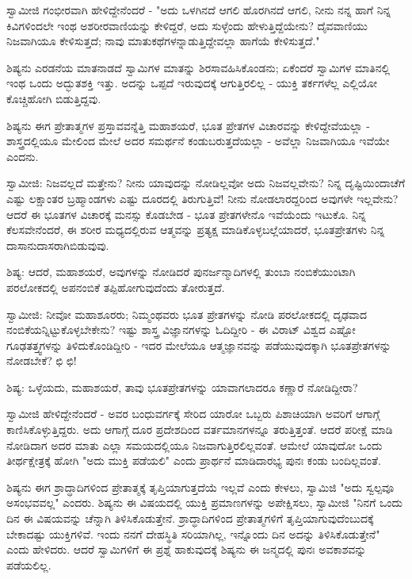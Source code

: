 ಸ್ವಾಮೀಜಿ ಗಂಭೀರವಾಗಿ ಹೇಳಿದ್ದೇನೆಂದರೆ - "ಅದು ಒಳಗಿನದೆ ಆಗಲಿ ಹೊರಗಿನದೆ ಆಗಲಿ, ನೀನು ನನ್ನ ಹಾಗೆ ನಿನ್ನ ಕಿವಿಗಳಿಂದಲೇ ಇಂಥ ಅಶರೀರವಾಣಿಯನ್ನು ಕೇಳಿದ್ದರೆ, ಅದು ಸುಳ್ಳೆಂದು ಹೇಳುತ್ತಿದ್ದೆಯೇನು? ದೈವವಾಣಿಯು ನಿಜವಾಗಿಯೂ ಕೇಳಿಸುತ್ತದೆ; ನಾವು ಮಾತುಕಥೆಗಳನ್ನಾಡುತ್ತಿದ್ದೇವಲ್ಲಾ ಹಾಗೆಯೆ ಕೇಳಿಸುತ್ತದೆ."

ಶಿಷ್ಯನು ಎರಡನೆಯ ಮಾತನಾಡದೆ ಸ್ವಾಮಿಗಳ ಮಾತನ್ನು ಶಿರಸಾವಹಿಸಿಕೊಂಡನು; ಏಕೆಂದರೆ ಸ್ವಾಮಿಗಳ ಮಾತಿನಲ್ಲಿ ಇಂಥ ಒಂದು ಅದ್ಭುತಶಕ್ತಿ ಇತ್ತು. ಅದನ್ನು ಒಪ್ಪದೆ ಇರುವುದಕ್ಕೆ ಆಗುತ್ತಿರಲಿಲ್ಲ - ಯುಕ್ತಿ ತರ್ಕಗಳೆಲ್ಲ ಎಲ್ಲಿಯೋ ಕೊಚ್ಚಿಹೋಗಿ ಬಿಡುತ್ತಿದ್ದವು.

ಶಿಷ್ಯನು ಈಗ ಪ್ರೇತಾತ್ಮಗಳ ಪ್ರಸ್ತಾವವನ್ನೆತ್ತಿ ಮಹಾಶಯರೆ, ಭೂತ ಪ್ರೇತಗಳ ವಿಚಾರವನ್ನು ಕೇಳಿದ್ದೇವೆಯಲ್ಲಾ - ಶಾಸ್ತ್ರದಲ್ಲಿಯೂ ಮೇಲಿಂದ ಮೇಲೆ ಅದರ ಸಮರ್ಥನೆ ಕಂಡುಬರುತ್ತದೆಯಲ್ಲಾ - ಅವೆಲ್ಲಾ ನಿಜವಾಗಿಯೂ ಇವೆಯೇ ಎಂದನು.

ಸ್ವಾಮೀಜಿ: ನಿಜವಲ್ಲದೆ ಮತ್ತೇನು? ನೀನು ಯಾವುದನ್ನು ನೋಡಿಲ್ಲವೋ ಅದು ನಿಜವಲ್ಲವೇನು? ನಿನ್ನ ದೃಷ್ಟಿಯಿಂದಾಚೆಗೆ ಎಷ್ಟು ಲಕ್ಷಾಂತರ ಬ್ರಹ್ಮಾಂಡಗಳು ಎಷ್ಟು ದೂರದಲ್ಲಿ ತಿರುಗುತ್ತಿವೆ! ನೀನು ನೋಡಲಾರದ್ದರಿಂದ ಅವುಗಳೇ ಇಲ್ಲವೇನು? ಆದರೆ ಈ ಭೂತಗಳ ವಿಚಾರಕ್ಕೆ ಮನಸ್ಸು ಕೊಡಬೇಡ - ಭೂತ ಪ್ರೇತಗಳೇನೊ ಇವೆಯೆಂದು ಇಟುಕೊ. ನಿನ್ನ ಕೆಲಸವೇನೆಂದರೆ, ಈ ಶರೀರ ಮಧ್ಯದಲ್ಲಿರುವ ಆತ್ಮವನ್ನು ಪ್ರತ್ಯಕ್ಷ ಮಾಡಿಕೊಳ್ಳಬಲ್ಲೆಯಾದರೆ, ಭೂತಪ್ರೇತಗಳು ನಿನ್ನ ದಾಸಾನುದಾಸರಾಗಿಬಿಡುವುವು.

ಶಿಷ್ಯ: ಆದರೆ, ಮಹಾಶಯರೆ, ಅವುಗಳನ್ನು ನೋಡಿದರೆ ಪುನರ್ಜನ್ಮಾದಿಗಳಲ್ಲಿ ತುಂಬಾ ನಂಬಿಕೆಯುಂಟಾಗಿ ಪರಲೋಕದಲ್ಲಿ ಅಪನಂಬಿಕೆ ತಪ್ಪಿಹೋಗುವುದೆಂದು ತೋರುತ್ತದೆ.

ಸ್ವಾಮೀಜಿ: ನೀವೋ ಮಹಾಶೂರರು; ನಿಮ್ಮಂಥವರು ಭೂತ ಪ್ರೇತಗಳನ್ನು ನೋಡಿ ಪರಲೋಕದಲ್ಲಿ ದೃಢವಾದ ನಂಬಿಕೆಯನ್ನಿಟ್ಟುಕೊಳ್ಳಬೇಕೇನು? ಇಷ್ಟು ಶಾಸ್ತ್ರ ವಿಜ್ಞಾನಗಳನ್ನು ಓದಿದ್ದೀರಿ - ಈ ವಿರಾಟ್ ವಿಶ್ವದ ಎಷ್ಟೋ ಗೂಢತತ್ತ್ವಗಳನ್ನು ತಿಳಿದುಕೊಂಡಿದ್ದೀರಿ - ಇದರ ಮೇಲೆಯೂ ಆತ್ಮಜ್ಞಾನವನ್ನು ಪಡೆಯುವುದಕ್ಕಾಗಿ ಭೂತಪ್ರೇತಗಳನ್ನು ನೋಡಬೇಕೆ? ಛಿ ಛಿ!

ಶಿಷ್ಯ: ಒಳ್ಳೆಯದು, ಮಹಾಶಯರೆ, ತಾವು ಭೂತಪ್ರೇತಗಳನ್ನು ಯಾವಾಗಲಾದರೂ ಕಣ್ಣಾರೆ ನೋಡಿದ್ದೀರಾ?

ಸ್ವಾಮೀಜಿ ಹೇಳಿದ್ದೇನೆಂದರೆ - ಅವರ ಬಂಧುವರ್ಗಕ್ಕೆ ಸೇರಿದ ಯಾರೋ ಒಬ್ಬರು ಪಿಶಾಚಿಯಾಗಿ ಅವರಿಗೆ ಆಗಾಗ್ಗೆ ಕಾಣಿಸಿಕೊಳ್ಳುತ್ತಿದ್ದರು. ಅದು ಆಗಾಗ್ಗೆ ದೂರ ಪ್ರದೇಶದಿಂದ ವರ್ತಮಾನಗಳನ್ನೂ ತರುತ್ತಿತ್ತಂತೆ. ಆದರೆ ಪರೀಕ್ಷೆ ಮಾಡಿ ನೋಡಿದಾಗ ಅದರ ಮಾತು ಎಲ್ಲಾ ಸಮಯದಲ್ಲಿಯೂ ನಿಜವಾಗುತ್ತಿರಲಿಲ್ಲವಂತೆ. ಆಮೇಲೆ ಯಾವುದೋ ಒಂದು ತೀರ್ಥಕ್ಷೇತ್ರಕ್ಕೆ ಹೋಗಿ "ಅದು ಮುಕ್ತಿ ಪಡೆಯಲಿ" ಎಂದು ಪ್ರಾರ್ಥನೆ ಮಾಡಿದಾರಭ್ಯ ಪುನಃ ಕಂಡು ಬಂದಿಲ್ಲವಂತೆ.

ಶಿಷ್ಯನು ಈಗ ಶ್ರಾದ್ಧಾದಿಗಳಿಂದ ಪ್ರೇತಾತ್ಮಕ್ಕೆ ತೃಪ್ತಿಯಾಗುತ್ತದೆಯೆ ಇಲ್ಲವೆ ಎಂದು ಕೇಳಲು, ಸ್ವಾಮಿಜಿ "ಅದು ಸ್ವಲ್ಪವೂ ಅಸಂಭವವಲ್ಲ" ಎಂದರು. ಶಿಷ್ಯನು ಈ ವಿಷಯದಲ್ಲಿ ಯುಕ್ತಿ ಪ್ರಮಾಣಗಳನ್ನು ಅಪೇಕ್ಷಿಸಲು, ಸ್ವಾಮೀಜಿ "ನಿನಗೆ ಒಂದು ದಿನ ಈ ವಿಷಯವನ್ನು ಚೆನ್ನಾಗಿ ತಿಳಿಸಿಕೊಡುತ್ತೇನೆ. ಶ್ರಾದ್ಧಾದಿಗಳಿಂದ ಪ್ರೇತಾತ್ಮಗಳಿಗೆ ತೃಪ್ತಿಯಾಗುವುದೆಂಬುದಕ್ಕೆ ಬೇಕಾದಷ್ಟು ಯುಕ್ತಿಗಳಿವೆ. ಇಂದು ನನಗೆ ದೇಹಸ್ಥಿತಿ ಸರಿಯಾಗಿಲ್ಲ, ಇನ್ನೊಂದು ದಿನ ಅದನ್ನು ತಿಳಿಸಿಕೊಡುತ್ತೇನೆ" ಎಂದು ಹೇಳಿದರು. ಆದರೆ ಸ್ವಾಮಿಗಳಿಗೆ ಈ ಪ್ರಶ್ನೆ ಹಾಕುವುದಕ್ಕೆ ಶಿಷ್ಯನು ಈ ಜನ್ಮದಲ್ಲಿ ಪುನಃ ಅವಕಾಶವನ್ನು ಪಡೆಯಲಿಲ್ಲ.

